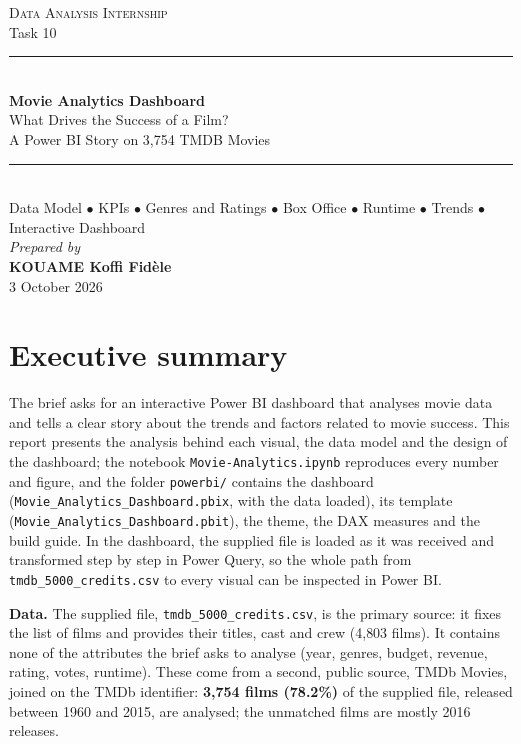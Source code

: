 \documentclass[12pt,a4paper]{article}
\begin{document}
\begin{titlepage}\centering
\singlespacing
\vspace*{3cm}
{\large\scshape Data Analysis Internship}\\[0.4cm]
{\normalsize Task 10}\\[2.0cm]
\rule{\linewidth}{0.5pt}\\[0.8cm]
{\LARGE\bfseries Movie Analytics Dashboard}\\[0.6cm]
{\large What Drives the Success of a Film?\\ A Power BI Story on 3{,}754 TMDB Movies}\\[0.8cm]
\rule{\linewidth}{0.5pt}\\[1.2cm]
{\normalsize Data Model $\bullet$ KPIs $\bullet$ Genres and Ratings $\bullet$ Box Office
$\bullet$ Runtime $\bullet$ Trends $\bullet$ Interactive Dashboard}\\[3.2cm]
{\large\itshape Prepared by}\\[0.5cm]
{\Large\bfseries KOUAME Koffi Fid\`ele}\\[0.6cm]
{\large 3 October 2026}
\vfill\end{titlepage}

\singlespacing
\tableofcontents\newpage
\onehalfspacing

\section{Executive summary}

The brief asks for an interactive Power BI dashboard that analyses movie data and
tells a clear story about the trends and factors related to movie success. This
report presents the analysis behind each visual, the data model and the design of
the dashboard; the notebook \texttt{Movie-Analytics.ipynb} reproduces every number
and figure, and the folder \texttt{powerbi/} contains the dashboard
(\texttt{Movie\_Analytics\_Dashboard.pbix}, with the data loaded), its template
(\texttt{Movie\_Analytics\_Dashboard.pbit}), the theme, the DAX measures and the build
guide. In the dashboard, the supplied file is loaded as it was received and transformed
step by step in Power Query, so the whole path from \texttt{tmdb\_5000\_credits.csv} to
every visual can be inspected in Power BI.

\textbf{Data.} The supplied file, \texttt{tmdb\_5000\_credits.csv}, is the primary source:
it fixes the list of films and provides their titles, cast and crew (4{,}803 films). It
contains none of the attributes the brief asks to analyse (year, genres, budget,
revenue, rating, votes, runtime). These come from a second, public source, TMDb Movies,
joined on the TMDb identifier: \textbf{3{,}754 films (78.2\%)} of the supplied file,
released between 1960 and 2015, are analysed; the unmatched films are mostly 2016
releases.
\end{document}
